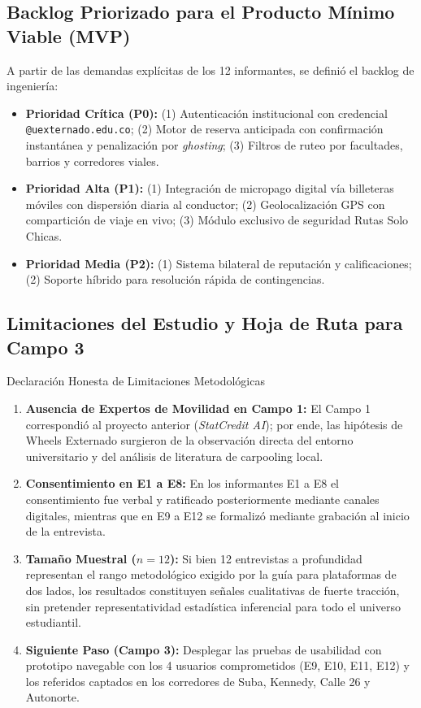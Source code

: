 \documentclass[11pt,a4paper]{article}
\begin{document}
\subsection{Backlog Priorizado para el Producto M\'inimo Viable (MVP)}
A partir de las demandas expl\'icitas de los 12 informantes, se defini\'o el backlog de ingenier\'ia:
\begin{itemize}[leftmargin=*]
    \item \textbf{Prioridad Cr\'itica (P0):} (1) Autenticaci\'on institucional con credencial \texttt{@uexternado.edu.co}; (2) Motor de reserva anticipada con confirmaci\'on instant\'anea y penalizaci\'on por \textit{ghosting}; (3) Filtros de ruteo por facultades, barrios y corredores viales.
    \item \textbf{Prioridad Alta (P1):} (1) Integraci\'on de micropago digital v\'ia billeteras m\'oviles con dispersi\'on diaria al conductor; (2) Geolocalizaci\'on GPS con compartici\'on de viaje en vivo; (3) M\'odulo exclusivo de seguridad \guillemotleft Rutas Solo Chicas\guillemotright.
    \item \textbf{Prioridad Media (P2):} (1) Sistema bilateral de reputaci\'on y calificaciones; (2) Soporte h\'ibrido para resoluci\'on r\'apida de contingencias.
\end{itemize}

\subsection{Limitaciones del Estudio y Hoja de Ruta para Campo 3}
\begin{warningbox}{Declaraci\'on Honesta de Limitaciones Metodol\'ogicas}
\begin{enumerate}[leftmargin=*]
    \item \textbf{Ausencia de Expertos de Movilidad en Campo 1:} El Campo 1 correspondi\'o al proyecto anterior (\textit{StatCredit AI}); por ende, las hip\'otesis de Wheels Externado surgieron de la observaci\'on directa del entorno universitario y del an\'alisis de literatura de carpooling local.
    \item \textbf{Consentimiento en E1 a E8:} En los informantes E1 a E8 el consentimiento fue verbal y ratificado posteriormente mediante canales digitales, mientras que en E9 a E12 se formaliz\'o mediante grabaci\'on al inicio de la entrevista.
    \item \textbf{Tama\~no Muestral ($n=12$):} Si bien 12 entrevistas a profundidad representan el rango metodol\'ogico exigido por la gu\'ia para plataformas de dos lados, los resultados constituyen se\~nales cualitativas de fuerte tracci\'on, sin pretender representatividad estad\'istica inferencial para todo el universo estudiantil.
    \item \textbf{Siguiente Paso (Campo 3):} Desplegar las pruebas de usabilidad con prototipo navegable con los 4 usuarios comprometidos (E9, E10, E11, E12) y los referidos captados en los corredores de Suba, Kennedy, Calle 26 y Autonorte.
\end{enumerate}
\end{warningbox}
\end{document}
